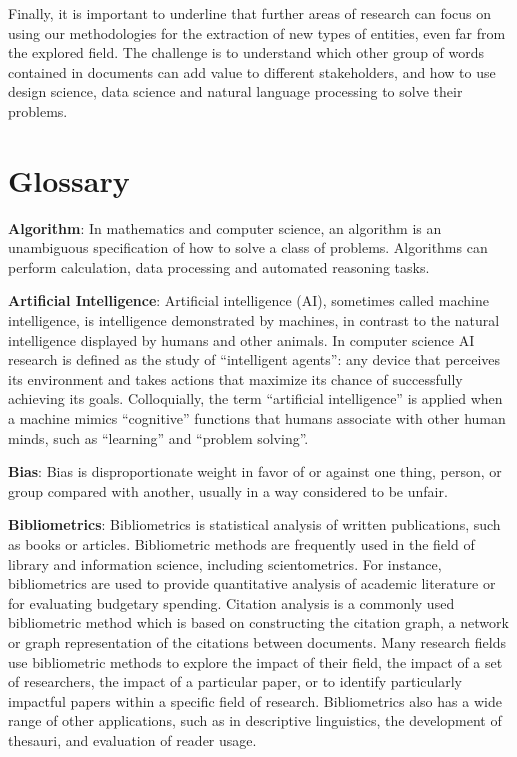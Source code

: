 \documentclass[b5paper,]{book}
\theoremstyle{definition}
\theoremstyle{definition}
\theoremstyle{definition}
\theoremstyle{remark}
\begin{document}
Finally, it is important to underline that further areas of research can
focus on using our methodologies for the extraction of new types of
entities, even far from the explored field. The challenge is to
understand which other group of words contained in documents can add
value to different stakeholders, and how to use design science, data
science and natural language processing to solve their problems.

\chapter*{Glossary}\label{glossary}

\textbf{Algorithm}: In mathematics and computer science, an algorithm is
an unambiguous specification of how to solve a class of problems.
Algorithms can perform calculation, data processing and automated
reasoning tasks.

\textbf{Artificial Intelligence}: Artificial intelligence (AI),
sometimes called machine intelligence, is intelligence demonstrated by
machines, in contrast to the natural intelligence displayed by humans
and other animals. In computer science AI research is defined as the
study of ``intelligent agents'': any device that perceives its
environment and takes actions that maximize its chance of successfully
achieving its goals. Colloquially, the term ``artificial intelligence''
is applied when a machine mimics ``cognitive'' functions that humans
associate with other human minds, such as ``learning'' and ``problem
solving''.

\textbf{Bias}: Bias is disproportionate weight in favor of or against
one thing, person, or group compared with another, usually in a way
considered to be unfair.

\textbf{Bibliometrics}: Bibliometrics is statistical analysis of written
publications, such as books or articles. Bibliometric methods are
frequently used in the field of library and information science,
including scientometrics. For instance, bibliometrics are used to
provide quantitative analysis of academic literature or for evaluating
budgetary spending. Citation analysis is a commonly used bibliometric
method which is based on constructing the citation graph, a network or
graph representation of the citations between documents. Many research
fields use bibliometric methods to explore the impact of their field,
the impact of a set of researchers, the impact of a particular paper, or
to identify particularly impactful papers within a specific field of
research. Bibliometrics also has a wide range of other applications,
such as in descriptive linguistics, the development of thesauri, and
evaluation of reader usage.
\end{document}
